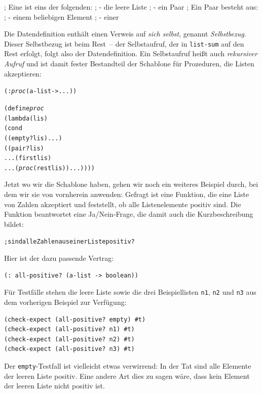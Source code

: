 \begin{pspdf}
\begin{ttfamily}\obeylines
; Eine  ist eins der folgenden:
; - die leere Liste
; - ein Paar
; Ein Paar besteht aus:
; - einem beliebigen Element
; - einer 
\end{ttfamily}
\end{pspdf}

Die Datendefinition enthält einen Verweis auf \emph{sich selbst},
genannt \emph{Selbstbezug}.  Dieser Selbstbezug ist
beim Rest~-- der Selbstaufruf, der in \texttt{list-sum} auf den Rest
erfolgt, folgt also der Datendefinition.  Ein Selbstaufruf
heißt auch \textit{rekursiver Aufruf} und ist
damit fester Bestandteil der Schablone für Prozeduren, die Listen
akzeptieren:
%
\begin{alltt}
(: \textit{proc} (a-list -> ...))

(define \textit{proc}
  (lambda (lis)
    (cond
      ((empty? lis) ...)
      ((pair? lis)
       ... (first lis)
       ... (\textit{proc} (rest lis)) ...))))
\end{alltt}
%
Jetzt wo wir die Schablone haben, gehen wir noch ein weiteres Beispiel
durch, bei dem wir sie von vornherein anwenden:  Gefragt ist eine
Funktion, die eine Liste von Zahlen akzeptiert und feststellt, ob alle
Listenelemente  positiv sind.  Die Funktion beantwortet eine
Ja/Nein-Frage, die damit auch die Kurzbeschreibung bildet:
%
\begin{alltt}
; sind alle Zahlen aus einer Liste positiv?
\end{alltt}
%
Hier ist der dazu passende Vertrag:
%
\begin{verbatim}
(: all-positive? (a-list -> boolean))
\end{verbatim}
%
Für Testfälle stehen die leere Liste sowie die drei Beispiellisten
\texttt{n1}, \texttt{n2} und \texttt{n3} aus dem vorherigen Beispiel
zur Verfügung:
%
\begin{verbatim}
(check-expect (all-positive? empty) #t)
(check-expect (all-positive? n1) #t)
(check-expect (all-positive? n2) #t)
(check-expect (all-positive? n3) #t)
\end{verbatim}
%
Der \texttt{empty}-Testfall ist vielleicht etwas verwirrend: In der
Tat sind alle Elemente der leeren Liste positiv.  Eine andere Art dies
zu sagen wäre, dass kein Element der leeren Liste nicht positiv ist.

